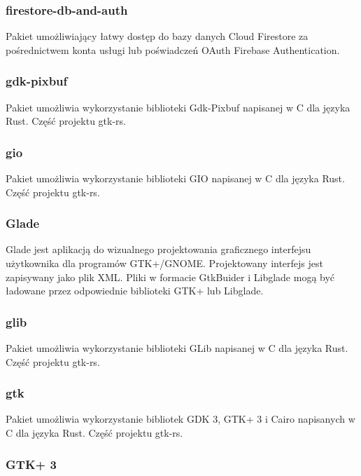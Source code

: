 \documentclass[12pt,a4paper]{article}
\begin{document}
				\subsubsection{firestore-db-and-auth}

					\indent Pakiet umożliwiający łatwy dostęp do bazy danych Cloud Firestore za pośrednictwem konta usługi lub poświadczeń OAuth Firebase Authentication.				
				\subsubsection{gdk-pixbuf}

					\indent Pakiet umożliwia wykorzystanie biblioteki Gdk-Pixbuf napisanej w C dla języka Rust. Część projektu gtk-rs.
				\subsubsection{gio}

					\indent Pakiet umożliwia wykorzystanie biblioteki GIO napisanej w C dla języka Rust. Część projektu gtk-rs.
				\subsubsection{Glade}

					\indent Glade jest aplikacją do wizualnego projektowania graficznego interfejsu użytkownika dla programów GTK+/GNOME.
					Projektowany interfejs jest zapisywany jako plik XML. Pliki w formacie GtkBuider i Libglade mogą być ładowane przez odpowiednie biblioteki GTK+ lub Libglade. 
				\subsubsection{glib}

					\indent  Pakiet umożliwia wykorzystanie biblioteki GLib napisanej w C dla języka Rust. Część projektu gtk-rs.
				\subsubsection{gtk}

					\indent Pakiet umożliwia wykorzystanie bibliotek GDK 3, GTK+ 3 i Cairo napisanych w C dla języka Rust. Część projektu gtk-rs.
				\subsubsection{GTK+ 3}
\end{document}
